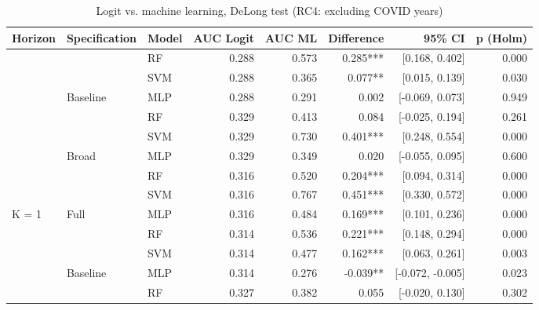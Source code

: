 \begin{table}

\caption{\label{tab:delong_rc4}Logit vs. machine learning, DeLong test (RC4: excluding COVID years)}
\centering
\begin{threeparttable}
\begin{tabular}[t]{lllrrrrr}
\toprule
Horizon & Specification & Model & AUC Logit & AUC ML & Difference & 95\% CI & p (Holm)\\
\midrule
 &  & RF & 0.288 & 0.573 & 0.285*** & {}[0.168, 0.402] & 0.000\\

 &  & SVM & 0.288 & 0.365 & 0.077** & {}[0.015, 0.139] & 0.030\\

 & \multirow[t]{-2}{*}[\normalbaselineskip]{\raggedright\arraybackslash Baseline} & MLP & 0.288 & 0.291 & 0.002 & {}[-0.069, 0.073] & 0.949\\

 &  & RF & 0.329 & 0.413 & 0.084 & {}[-0.025, 0.194] & 0.261\\

 &  & SVM & 0.329 & 0.730 & 0.401*** & {}[0.248, 0.554] & 0.000\\

 & \multirow[t]{-2}{*}[\normalbaselineskip]{\raggedright\arraybackslash Broad} & MLP & 0.329 & 0.349 & 0.020 & {}[-0.055, 0.095] & 0.600\\

 &  & RF & 0.316 & 0.520 & 0.204*** & {}[0.094, 0.314] & 0.000\\

 &  & SVM & 0.316 & 0.767 & 0.451*** & {}[0.330, 0.572] & 0.000\\

\multirow[t]{-8}{*}[\normalbaselineskip]{\raggedright\arraybackslash K = 1} & \multirow[t]{-2}{*}[\normalbaselineskip]{\raggedright\arraybackslash Full} & MLP & 0.316 & 0.484 & 0.169*** & {}[0.101, 0.236] & 0.000\\
\cmidrule{1-8}
 &  & RF & 0.314 & 0.536 & 0.221*** & {}[0.148, 0.294] & 0.000\\

 &  & SVM & 0.314 & 0.477 & 0.162*** & {}[0.063, 0.261] & 0.003\\

 & \multirow[t]{-2}{*}[\normalbaselineskip]{\raggedright\arraybackslash Baseline} & MLP & 0.314 & 0.276 & -0.039** & {}[-0.072, -0.005] & 0.023\\

 &  & RF & 0.327 & 0.382 & 0.055 & {}[-0.020, 0.130] & 0.302\\


\end{tabular}
\end{threeparttable}
\end{table}
